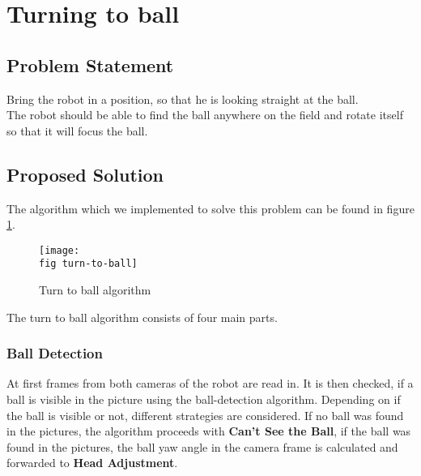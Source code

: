 \section{Turning to ball}
\label{j sec turning to ball}
\subsection*{Problem Statement}
Bring the robot in a position, so that he is looking straight at the ball.	\\
The robot should be able to find the ball anywhere on the field and rotate itself so that it will focus the ball. 

\subsection*{Proposed Solution}
The algorithm which we implemented to solve this problem can be found in figure \ref{j figure turn to ball}.

\begin{figure}[ht]
	\texttt{[image: \\fig turn-to-ball]}
	\caption{Turn to ball algorithm}
	\label{j figure turn to ball}
\end{figure}

The turn to ball algorithm consists of four main parts. 

\subsubsection*{Ball Detection}
\label{j sec ball detection} 
At first frames from both cameras of the robot are read in. It is then checked, if a ball is visible in the picture using the ball-detection algorithm. Depending on if the ball is visible or not, different strategies are considered. If no ball was found in the pictures, the algorithm proceeds with \textbf{Can't See the Ball}, if the ball was found in the pictures, the ball yaw angle in the camera frame is calculated and forwarded to \textbf{Head Adjustment}.

